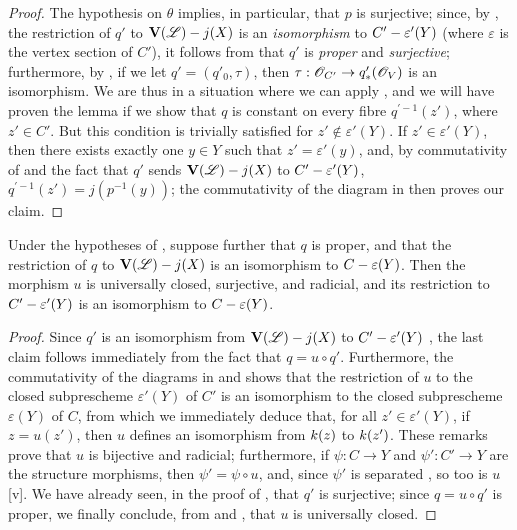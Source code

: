 \begin{proof}
\label{proof-2.8.11.5}
The hypothesis on $\theta$ implies, in particular, that $p$ is surjective;
since, by , the restriction of $q'$ to $\mathbf{V}(\mathscr{L})- j(X)$ is an \emph{isomorphism} to $C'-\varepsilon'(Y)$ (where $\varepsilon$ is the vertex section of $C'$), it follows from  that $q'$ is \emph{proper} and \emph{surjective};
furthermore, by , if we let $q'=(q'_0,\tau)$, then $\tau:\sh{O}_{C'}\to q'_*(\sh{O}_V)$ is an isomorphism.
We are thus in a situation where we can apply , and we will have proven the lemma if we show that $q$ is constant on every fibre $q^{'-1}(z')$, where $z'\in C'$.
But this condition is trivially satisfied for $z'\not\in\varepsilon'(Y)$.
If $z'\in\varepsilon'(Y)$, then there exists exactly one $y\in Y$ such that $z'=\varepsilon'(y)$, and, by commutativity of  and the fact that $q'$ sends $\mathbf{V}(\mathscr{L})- j(X)$ to $C'-\varepsilon'(Y)$, $q^{'-1}(z')=j(p^{-1}(y))$;
the commutativity of the diagram in  then proves our claim.
\end{proof}

\begin{corollary}[8.11.6]
\label{II.8.11.6}
Under the hypotheses of , suppose further that $q$ is proper, and that the restriction of $q$ to $\mathbf{V}(\mathscr{L})- j(X)$ is an isomorphism to $C-\varepsilon(Y)$.
Then the morphism $u$ is universally closed, surjective, and radicial, and its restriction to $C'-\varepsilon'(Y)$ is an isomorphism to $C-\varepsilon(Y)$.
\end{corollary}

\begin{proof}
\label{proof-2.8.11.6}
Since $q'$ is an isomorphism from $\mathbf{V}(\mathscr{L})- j(X)$ to $C'-\varepsilon'(Y)$ , the last claim follows immediately from the fact that $q=u\circ q'$.
Furthermore, the commutativity of the diagrams
in  and  shows that the restriction of $u$ to the closed subprescheme $\varepsilon'(Y)$ of $C'$ is an isomorphism to the closed subprescheme $\varepsilon(Y)$ of $C$, from which we immediately deduce that, for all $z'\in\varepsilon'(Y)$, if $z=u(z')$, then $u$ defines an isomorphism from $k(z)$ to $k(z')$.
These remarks prove that $u$ is bijective and radicial;
furthermore, if $\psi:C\to Y$ and $\psi':C'\to Y$ are the structure morphisms, then $\psi'=\psi\circ u$, and, since $\psi'$ is separated , so too is $u$ [v].
We have already seen, in the proof of , that $q'$ is surjective;
since $q=u\circ q'$ is proper, we finally conclude, from  and , that $u$ is universally closed.
\end{proof}

